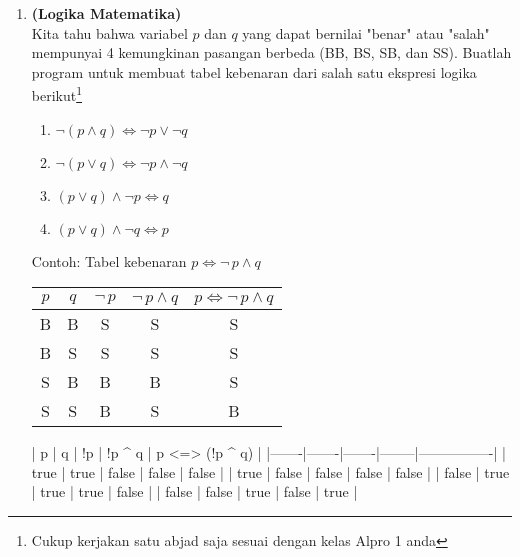 \documentclass{article}
\begin{document}
\begin{enumerate}[label=\textbf{\arabic*.}]
        \item \textbf{(Logika Matematika)}\\
        Kita tahu bahwa variabel $p$ dan $q$ yang dapat bernilai "benar" atau "salah" mempunyai 4 kemungkinan pasangan berbeda (BB, BS, SB, dan SS). Buatlah program untuk membuat tabel kebenaran dari salah satu ekspresi logika berikut\footnote{Cukup kerjakan satu abjad saja sesuai dengan kelas Alpro 1 anda}
        \begin{enumerate}[label=$\boxed{\text{\Alph*}}$]
            \item $\neg(p \land q) \Leftrightarrow \neg p \lor \neg q$  
            \item $\neg(p \lor q) \Leftrightarrow \neg p \land \neg q$ 
            \item $(p \lor q)\land \neg p \Leftrightarrow q$
            \item $(p \lor q)\land \neg q \Leftrightarrow p$
        \end{enumerate}
        Contoh: Tabel kebenaran $p\Leftrightarrow \neg\, p \land q$
        \begin{table}[h!]
            \centering
            \begin{tabular}{|c|c|c|c|c|}
                \hline
                $p$ & $q$ & $\neg\, p$ & $\neg\, p \land q$ & $p \Leftrightarrow \neg\, p \land q$\\
                \hline
                B & B & S & S & S\\
                B & S & S & S & S\\
                S & B & B & B & S\\
                S & S & B & S & B\\
                \hline
            \end{tabular}
        \end{table}
        \begin{RunCode}{}
|   p   |   q   |  !p   | !p ^ q | p <=> (!p ^ q) |
|-------|-------|-------|--------|----------------|
| true  | true  | false | false  | false          |
| true  | false | false | false  | false          |
| false | true  | true  | true   | false          |
| false | false | true  | false  | true           |
        \end{RunCode}


\end{enumerate}
\end{document}
